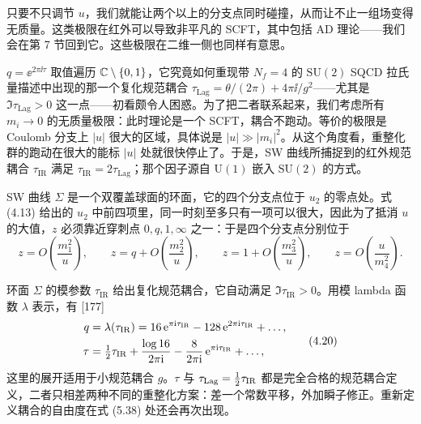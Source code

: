 
只要不只调节 $u$，我们就能让两个以上的分支点同时碰撞，从而让不止一组场变得无质量。这类极限在红外可以导致非平凡的 SCFT，其中包括 AD 理论------我们会在第 7 节回到它。这些极限在二维一侧也同样有意思。

 $q=\ee^{2\pi\ii\tau}$ 取值遍历 $\mathbb{C}\setminus\{0,1\}$，它究竟如何重现带 $N_f=4$ 的 $\mathrm{SU}(2)$ SQCD 拉氏量描述中出现的那一个复化规范耦合 $\tau_{\mathrm{Lag}}=\theta/(2\pi)+4\pi\ii/g^2$------尤其是 $\Im\tau_{\mathrm{Lag}}>0$ 这一点------初看颇令人困惑。为了把二者联系起来，我们考虑所有 $m_i\to0$ 的无质量极限：此时理论是一个 SCFT，耦合不跑动。等价的极限是 Coulomb 分支上 $|u|$ 很大的区域，具体说是 $|u|\gg|m_i|^2$。从这个角度看，重整化群的跑动在很大的能标 $|u|$ 处就很快停止了。于是，SW 曲线所捕捉到的红外规范耦合 $\tau_{\mathrm{IR}}$ 满足 $\tau_{\mathrm{IR}}=2\tau_{\mathrm{Lag}}$；那个因子源自 $\mathrm{U}(1)$ 嵌入 $\mathrm{SU}(2)$ 的方式。

SW 曲线 $\Sigma$ 是一个双覆盖球面的环面，它的四个分支点位于 $u_2$ 的零点处。式 (4.13) 给出的 $u_2$ 中前四项里，同一时刻至多只有一项可以很大，因此为了抵消 $u$ 的大值，$z$ 必须靠近穿刺点 $0,q,1,\infty$ 之一：于是四个分支点分别位于
\begin{equation}
  z=O\!\left(\frac{m_1^2}{u}\right),\qquad
  z=q+O\!\left(\frac{m_2^2}{u}\right),\qquad
  z=1+O\!\left(\frac{m_3^2}{u}\right),\qquad
  z=O\!\left(\frac{u}{m_4^2}\right).
  \tag{4.19}
\end{equation}


环面 $\Sigma$ 的模参数 $\tau_{\mathrm{IR}}$ 给出复化规范耦合，它自动满足 $\Im\tau_{\mathrm{IR}}>0$。用模 lambda 函数 $\lambda$ 表示，有 [177]
\begin{equation}
\begin{aligned}
  q &= \lambda(\tau_{\mathrm{IR}})=16\,\mathrm{e}^{\pi\mathrm{i}\tau_{\mathrm{IR}}}
       -128\,\mathrm{e}^{2\pi\mathrm{i}\tau_{\mathrm{IR}}}+\dots,\\
  \tau &= \tfrac{1}{2}\tau_{\mathrm{IR}}+\frac{\log 16}{2\pi\mathrm{i}}
       -\frac{8}{2\pi\mathrm{i}}\,\mathrm{e}^{\pi\mathrm{i}\tau_{\mathrm{IR}}}+\dots,
\end{aligned}
  \tag{4.20}
\end{equation}
这里的展开适用于小规范耦合 $g$。$\tau$ 与 $\tau_{\mathrm{Lag}}=\tfrac{1}{2}\tau_{\mathrm{IR}}$ 都是完全合格的规范耦合定义，二者只相差两种不同的重整化方案：差一个常数平移，外加瞬子修正。重新定义耦合的自由度在式 (5.38) 处还会再次出现。

